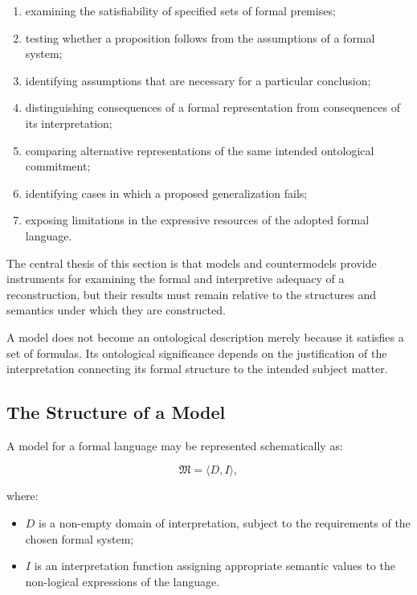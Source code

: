 \begin{enumerate}
    \item examining the satisfiability of specified sets
    of formal premises;

    \item testing whether a proposition follows from
    the assumptions of a formal system;

    \item identifying assumptions that are necessary
    for a particular conclusion;

    \item distinguishing consequences of a formal
    representation from consequences of its interpretation;

    \item comparing alternative representations of the
    same intended ontological commitment;

    \item identifying cases in which a proposed
    generalization fails;

    \item exposing limitations in the expressive resources
    of the adopted formal language.
\end{enumerate}

The central thesis of this section is that models and
countermodels provide instruments for examining the
formal and interpretive adequacy of a reconstruction,
but their results must remain relative to the structures
and semantics under which they are constructed.

A model does not become an ontological description
merely because it satisfies a set of formulas. Its
ontological significance depends on the justification
of the interpretation connecting its formal structure
to the intended subject matter.

\subsection{The Structure of a Model}

A model for a formal language may be represented
schematically as:

\[
    \mathfrak{M}
    =
    \langle D, I \rangle,
\]

where:

\begin{itemize}
    \item \(D\) is a non-empty domain of interpretation,
    subject to the requirements of the chosen formal system;

    \item \(I\) is an interpretation function assigning
    appropriate semantic values to the non-logical
    expressions of the language.
\end{itemize}

